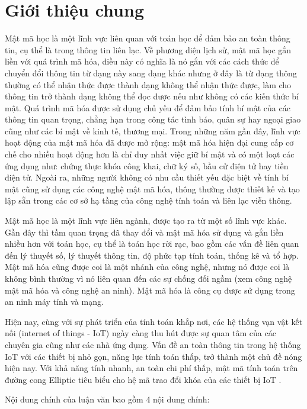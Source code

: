 \documentclass[a4paper,12pt]{report}
\begin{document}
\chapter*{Giới thiệu chung}
Mật mã học là một lĩnh vực liên quan với toán học để đảm bảo an toàn thông tin, cụ thể là trong thông tin liên lạc. Về phương diện lịch sử, mật mã học gắn liền với quá trình mã hóa, điều này có nghĩa là nó gắn với các cách thức để chuyển đổi thông tin từ dạng này sang dạng khác nhưng ở đây là từ dạng thông thường có thể nhận thức được thành dạng không thể nhận thức được, làm cho thông tin trở thành dạng không thể đọc được nếu như không có các kiến thức bí mật. Quá trình mã hóa được sử dụng chủ yếu để đảm bảo tính bí mật của các thông tin quan trọng, chẳng hạn trong công tác tình báo, quân sự hay ngoại giao cũng như các bí mật về kinh tế, thương mại.  Trong những năm gần đây, lĩnh vực hoạt động của mật mã hóa đã được mở rộng: mật mã hóa hiện đại cung cấp cơ chế cho nhiều hoạt động hơn là chỉ duy nhất việc giữ bí mật và có một loạt các ứng dụng như: chứng thực khóa công khai, chữ ký số, bầu cử điện tử hay tiền điện tử. Ngoài ra, những người không có nhu cầu thiết yếu đặc biệt về tính bí mật cũng sử dụng các công nghệ mật mã hóa, thông thường được thiết kế và tạo lập sẵn trong các cơ sở hạ tầng của công nghệ tính toán và liên lạc viễn thông. 

Mật mã học là một lĩnh vực liên ngành, được tạo ra từ một số lĩnh vực khác. Gần đây thì tầm quan trọng đã thay đổi và mật mã hóa sử dụng và gắn liền nhiều hơn với toán học, cụ thể là toán học rời rạc, bao gồm các vấn đề liên quan đến lý thuyết số, lý thuyết thông tin, độ phức tạp tính toán, thống kê và tổ hợp. Mật mã hóa cũng được coi là một nhánh của công nghệ, nhưng nó được coi là không bình thường vì nó liên quan đến các sự chống đối ngầm (xem công nghệ mật mã hóa và công nghệ an ninh). Mật mã hóa là công cụ được sử dụng trong an ninh máy tính và mạng. 

Hiện nay, cùng với sự phát triển của tính toán khắp nơi, các hệ thống vạn vật kết nối (internet of things - IoT) ngày càng thu hút được sự quan tâm của các chuyên gia cũng như các nhà ứng dụng. Vấn đề an toàn thông tin trong hệ thống IoT với các thiết bị nhỏ gọn, năng lực tính toán thấp, trở thành một chủ đề nóng hiện nay. Với khả năng tính nhanh, an toàn chi phí thấp, mật mã tính toán trên đường cong Elliptic  tiêu biểu cho hệ mã trao đổi khóa của các thiết bị IoT .

Nội dung chính của luận văn bao gồm 4 nội dung chính:
\end{document}
